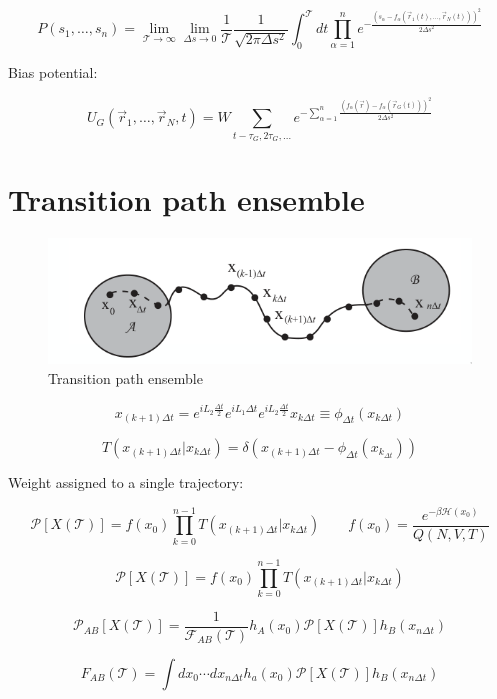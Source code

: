 $$P(s_1, \dots, s_n) = \lim\limits_{\mathcal{T}\rightarrow\infty}\lim\limits_{\Delta s\rightarrow 0}\frac{1}{\mathcal{T}}\frac{1}{\sqrt{2\pi\Delta s^2}}\int_0^{\mathcal{T}}dt\prod\limits_{\alpha=1}^ne^{-\frac{(s_\alpha-f_\alpha(\vec{r}_1(t), \dots, \vec{r}_N(t)))^2}{2\Delta s^2}}$$

Bias potential:

$$U_G(\vec{r}_1, \dots, \vec{r}_N, t) = W\sum\limits_{t - \tau_G, 2\tau_G, \dots}e^{-\sum\limits_{\alpha=1}^n\frac{(f_\alpha(\vec{r})-f_\alpha(\vec{r}_G(t)))^2}{2\Delta s^2}}$$

\section{Transition path ensemble}

\begin{figure}[H]
	\includegraphics[width=\textwidth]{transition-path-ensemble}
	\caption{Transition path ensemble}
	\label{fig:transition-path-ensemble}
\end{figure}

$$x_{(k+1)\Delta t} = e^{iL_2\frac{\Delta t}{2}}e^{iL_1\Delta t}e^{iL_2\frac{\Delta t}{2}}x_{k\Delta t}\equiv\phi_{\Delta t}(x_{k\Delta t})$$

$$T(x_{(k+1)\Delta t}|x_{k\Delta t}) = \delta(x_{(k+1)\Delta t}-\phi_{\Delta t}(x_{k_{\Delta t}}))$$

Weight assigned to a single trajectory:

$$\mathcal{P}[X(\mathcal{T})] = f(x_0)\prod\limits_{k=0}^{n-1}T(x_{(k+1)\Delta t}|x_{k\Delta t})\qquad f(x_0) = \frac{e^{-\beta\mathcal{H}(x_0)}}{Q(N, V, T)}$$

$$\mathcal{P}[X(\mathcal{T})] = f(x_0)\prod\limits_{k=0}^{n-1}T(x_{(k+1)\Delta t}|x_{k\Delta t})$$

$$\mathcal{P}_{AB}[X(\mathcal{T})] = \frac{1}{\mathcal{F}_{AB}(\mathcal{T})}h_A(x_0)\mathcal{P}[X(\mathcal{T})]h_B(x_{n\Delta t})$$

$$F_{AB}(\mathcal{T}) = \int dx_0\cdots dx_{n\Delta t}h_a(x_0)\mathcal{P}[X(\mathcal{T})]h_B(x_{n\Delta t})$$

